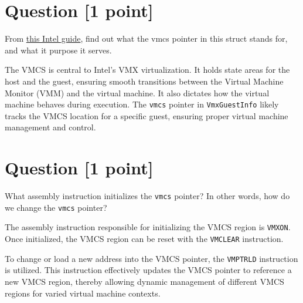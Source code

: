 \documentclass[11pt]{article}
\begin{document}
\section{Question [1 point]}

From \href{https://www.cs.utexas.edu/~vijay/cs378-f17/projects/64-ia-32-architectures-software-developer-vol-3c-part-3-manual.pdf}{this Intel guide}, find out what the vmcs pointer in this struct stands for, and what it purpose it serves.

\begin{solution}
The VMCS is central to Intel's VMX virtualization. It holds state areas for the host and the guest, ensuring smooth transitions between the Virtual Machine Monitor (VMM) and the virtual machine. It also dictates how the virtual machine behaves during execution. The \texttt{vmcs} pointer in \texttt{VmxGuestInfo} likely tracks the VMCS location for a specific guest, ensuring proper virtual machine management and control.

\end{solution}


\section{Question [1 point]}

What assembly instruction initializes the \texttt{vmcs} pointer? In other words, how do we change the \texttt{vmcs} pointer?

\begin{solution}
The assembly instruction responsible for initializing the VMCS region is \texttt{VMXON}. Once initialized, the VMCS region can be reset with the \texttt{VMCLEAR} instruction. 

To change or load a new address into the VMCS pointer, the \texttt{VMPTRLD} instruction is utilized. This instruction effectively updates the VMCS pointer to reference a new VMCS region, thereby allowing dynamic management of different VMCS regions for varied virtual machine contexts.

\end{solution}
\end{document}
